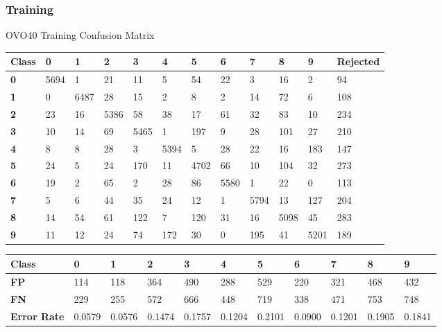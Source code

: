 \documentclass[
  a4paper,            %
  DIV=10,             %
  oneside,            %
  BCOR=5mm,           %
  parskip=half,       %
  numbers=noenddot,   %
  bibtotoc,           %
  listof=totoc,        %
  article
]{scrreprt}
\begin{document}
\subsubsection{Training}
\begin{center}
  \small{OVO40 Training Confusion Matrix}
  \begin{tabular}{|p{1cm}|p{1cm}|p{1cm}|p{1cm}|p{1cm}|p{1cm}|p{1cm}|p{1cm}|p{1cm}|p{1cm}|p{1cm}|p{1.7cm}|}
    \hline
    \textbf{Class} & \textbf{0} & \textbf{1} & \textbf{2} & \textbf{3} & \textbf{4} & \textbf{5} & \textbf{6} & \textbf{7} & \textbf{8} & \textbf{9} & \textbf{Rejected} \\
    \hline
    \textbf{0} & 5694 & 1 & 21 & 11 & 5 & 54 & 22 & 3 & 16 & 2 & 94 \\
    \hline
    \textbf{1} & 0 & 6487 & 28 & 15 & 2 & 8 & 2 & 14 & 72 & 6 & 108 \\
    \hline
    \textbf{2} & 23 & 16 & 5386 & 58 & 38 & 17 & 61 & 32 & 83 & 10 & 234 \\
    \hline
    \textbf{3} & 10 & 14 & 69 & 5465 & 1 & 197 & 9 & 28 & 101 & 27 & 210 \\
    \hline
    \textbf{4} & 8 & 8 & 28 & 3 & 5394 & 5 & 28 & 22 & 16 & 183 & 147 \\
    \hline
    \textbf{5} & 24 & 5 & 24 & 170 & 11 & 4702 & 66 & 10 & 104 & 32 & 273 \\
    \hline
    \textbf{6} & 19 & 2 & 65 & 2 & 28 & 86 & 5580 & 1 & 22 & 0 & 113 \\
    \hline
    \textbf{7} & 5 & 6 & 44 & 35 & 24 & 12 & 1 & 5794 & 13 & 127 & 204 \\
    \hline
    \textbf{8} & 14 & 54 & 61 & 122 & 7 & 120 & 31 & 16 & 5098 & 45 & 283 \\
    \hline
    \textbf{9} & 11 & 12 & 24 & 74 & 172 & 30 & 0 & 195 & 41 & 5201 & 189 \\
    \hline
  \end{tabular}
\end{center}

\begin{center}
  \begin{tabular}{|p{1cm}|p{1cm}|p{1cm}|p{1cm}|p{1cm}|p{1cm}|p{1cm}|p{1cm}|p{1cm}|p{1cm}|p{1cm}|}
    \hline
    \textbf{Class} & \textbf{0} & \textbf{1} & \textbf{2} & \textbf{3} & \textbf{4} & \textbf{5} & \textbf{6} & \textbf{7} & \textbf{8} & \textbf{9} \\
    \hline
    \textbf{FP} & 114 & 118 & 364 & 490 & 288 & 529 & 220 & 321 & 468 & 432 \\
    \hline
    \textbf{FN} & 229 & 255 & 572 & 666 & 448 & 719 & 338 & 471 & 753 & 748 \\
    \hline
    \textbf{Error Rate} & 0.0579 & 0.0576 & 0.1474 & 0.1757 & 0.1204 & 0.2101 & 0.0900 & 0.1201 & 0.1905 & 0.1841 \\
    \hline
  \end{tabular}
\end{center}
\end{document}
